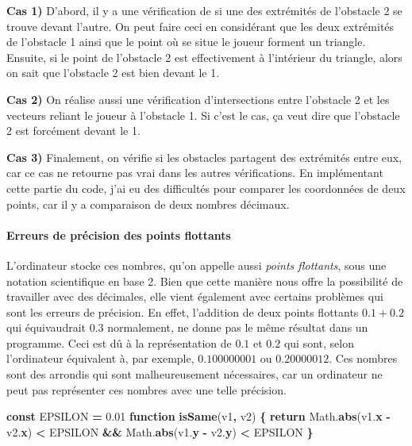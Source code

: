 \documentclass[11pt,french,a4paper,]{article}
\newenvironment{Shaded}{\begin{snugshade}}{\end{snugshade}}
\newcommand{\AttributeTok}[1]{\textcolor[rgb]{0.00,0.36,0.77}{\textbf{#1}}}
\newcommand{\ControlFlowTok}[1]{\textcolor[rgb]{0.68,0.35,0.62}{\textbf{#1}}}
\newcommand{\FloatTok}[1]{\textcolor[rgb]{0.00,0.00,0.81}{#1}}
\newcommand{\KeywordTok}[1]{\textcolor[rgb]{0.68,0.35,0.62}{\textbf{#1}}}
\newcommand{\NormalTok}[1]{#1}
\newcommand{\OperatorTok}[1]{\textcolor[rgb]{0.81,0.36,0.00}{\textbf{#1}}}
\newcommand{\VariableTok}[1]{\textcolor[rgb]{0.90,0.33,0.00}{#1}}
\let\oldparagraph\paragraph
\renewcommand{\paragraph}[1]{\oldparagraph{#1}\mbox{}}
\begin{document}
\textbf{Cas 1)} D'abord, il y a une vérification de si une des
extrémités de l'obstacle 2 se trouve devant l'autre. On peut faire ceci
en considérant que les deux extrémités de l'obstacle 1 ainsi que le
point où se situe le joueur forment un triangle. Ensuite, si le point de
l'obstacle 2 est effectivement à l'intérieur du triangle, alors on sait
que l'obstacle 2 est bien devant le 1.

\textbf{Cas 2)} On réalise aussi une vérification d'intersections entre
l'obstacle 2 et les vecteurs reliant le joueur à l'obstacle 1. Si c'est
le cas, ça veut dire que l'obstacle 2 est forcément devant le 1.

\textbf{Cas 3)} Finalement, on vérifie si les obstacles partagent des
extrémités entre eux, car ce cas ne retourne pas vrai dans les autres
vérifications. En implémentant cette partie du code, j'ai eu des
difficultés pour comparer les coordonnées de deux points, car il y a
comparaison de deux nombres décimaux.

\hypertarget{erreurs-de-pruxe9cision-des-points-flottants}{%
\paragraph{Erreurs de précision des points
flottants}\label{erreurs-de-pruxe9cision-des-points-flottants}}

L'ordinateur stocke ces nombres, qu'on appelle aussi \emph{points
flottants}, sous une notation scientifique en base 2. Bien que cette
manière nous offre la possibilité de travailler avec des décimales, elle
vient également avec certains problèmes qui sont les erreurs de
précision. En effet, l'addition de deux points flottants \(0.1 + 0.2\)
qui équivaudrait \(0.3\) normalement, ne donne pas le même résultat dans
un programme. Ceci est dû à la représentation de \(0.1\) et \(0.2\) qui
sont, selon l'ordinateur équivalent à, par exemple, \(0.100000001\) ou
\(0.20000012\). Ces nombres sont des arrondis qui sont malheureusement
nécessaires, car un ordinateur ne peut pas représenter ces nombres avec
une telle précision.

\begin{Shaded}
\begin{Highlighting}[]
\KeywordTok{const}\NormalTok{ EPSILON }\OperatorTok{=} \FloatTok{0.01}
\KeywordTok{function} \AttributeTok{isSame}\NormalTok{(v1}\OperatorTok{,}\NormalTok{ v2) }\OperatorTok{\{}
    \ControlFlowTok{return}  \VariableTok{Math}\NormalTok{.}\AttributeTok{abs}\NormalTok{(}\VariableTok{v1}\NormalTok{.}\AttributeTok{x} \OperatorTok{-} \VariableTok{v2}\NormalTok{.}\AttributeTok{x}\NormalTok{) }\OperatorTok{<}\NormalTok{ EPSILON }\OperatorTok{&&}
            \VariableTok{Math}\NormalTok{.}\AttributeTok{abs}\NormalTok{(}\VariableTok{v1}\NormalTok{.}\AttributeTok{y} \OperatorTok{-} \VariableTok{v2}\NormalTok{.}\AttributeTok{y}\NormalTok{) }\OperatorTok{<}\NormalTok{ EPSILON}
\OperatorTok{\}}
\end{Highlighting}
\end{Shaded}
\end{document}
